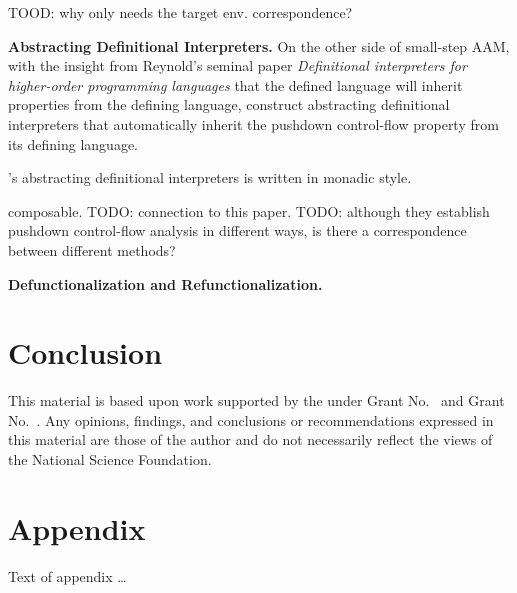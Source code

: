 \documentclass[acmsmall,review,anonymous]{acmart}\settopmatter{printfolios=true,printccs=false,printacmref=false}
\begin{document}
TOOD: why only needs the target env. correspondence?

\textbf{Abstracting Definitional Interpreters.}
On the other side of small-step AAM, with the insight from Reynold's seminal paper 
\emph{Definitional interpreters for higher-order programming languages} \cite{reynolds1972definitional}
that the defined language will inherit properties from the defining language, 
\citeauthor{darais2017abstracting} construct abstracting 
definitional interpreters that automatically inherit the pushdown control-flow 
property from its defining language.

\citeauthor{darais2017abstracting}'s abstracting definitional interpreters is written
in monadic style.

composable.
TODO: connection to this paper.
TODO: although they establish pushdown control-flow analysis in different ways, 
is there a correspondence between different methods?

\textbf{Defunctionalization and Refunctionalization.}

\section{Conclusion}

\begin{acks}                            %
  This material is based upon work supported by the
   under Grant
  No.~ and Grant
  No.~.  Any opinions, findings, and
  conclusions or recommendations expressed in this material are those
  of the author and do not necessarily reflect the views of the
  National Science Foundation.
\end{acks}



\appendix
\section{Appendix}

Text of appendix \ldots
\end{document}
